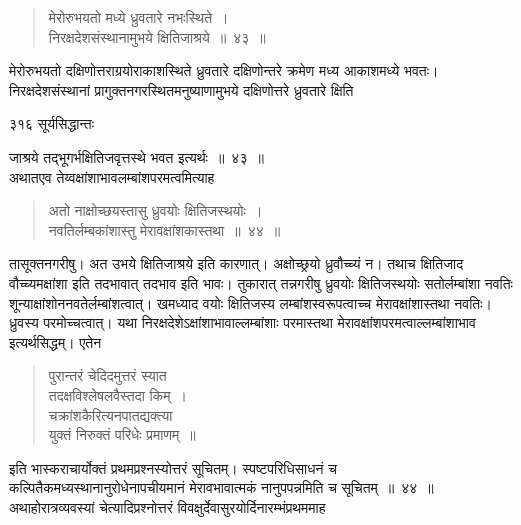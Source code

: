\documentclass[11pt, openany]{book}
\begin{document}
 \begin{quote}
{\ssi मेरोरुभयतो मध्ये ध्रुवतारे नभःस्थिते~।\\
 निरक्षदेशसंस्थानामुभये क्षितिजाश्रये~॥~४३~॥}
\end{quote}
 मेरोरुभयतो दक्षिणोत्तराग्रयोराकाशस्थिते ध्रुवतारे दक्षिणोन्तरे क्रमेण मध्य आकाशमध्ये भवतः। निरक्षदेशसंस्थानां प्रागुक्तनगरस्थितमनुष्याणामुभये दक्षिणोत्तरे ध्रुवतारे क्षिति \textendash



\newpage


\noindent ३१६ \hspace{4cm} सूर्यसिद्धान्तः
\vspace{1cm}


जाश्रये तद्भूगर्भक्षितिजवृत्तस्थे भवत इत्यर्थः~॥~४३~॥\\
\noindent अथातएव तेय्वक्षांशाभावलम्बांशपरमत्वमित्याह \textendash

 \begin{quote}
{\ssi अतो नाक्षोच्छयस्तासु ध्रुवयोः क्षितिजस्थयोः~।\\
 नवतिर्लम्बकांशास्तु मेरावक्षांशकास्तथा~॥~४४~॥}
 \end{quote}

 तासूक्तनगरीषु। अत उभये क्षितिजाश्रये इति कारणात्। अक्षोच्छ्रयो ध्रुवौच्च्यं न। तथाच क्षितिजाद वौच्च्यमक्षांशा इति तदभावात् तदभाव इति भावः। तुकारात् तन्नगरीषु ध्रुवयोः क्षितिजस्थयोः सतोर्लम्बांशा नवतिः शून्याक्षांशोननवतेर्लम्बांशत्वात्। खमध्याद वयोः क्षितिजस्य लम्बांशस्वरूपत्वाच्च मेरावक्षांशास्तथा नवतिः। ध्रुवस्य परमोच्चत्वात्। यथा निरक्षदेशेऽक्षांशाभावाल्लम्बांशाः परमास्तथा मेरावक्षांशपरमत्वाल्लम्बांशाभाव इत्यर्थसिद्धम्। एतेन 

\begin{quote}
{\qt  पुरान्तरं चेदिदमुत्तरं स्यात \\
तदक्षविश्लेषलवैस्तदा किम्~।\\
चक्रांशकैरित्यनपातद्यक्त्या\\
युक्तं निरुक्तं परिधेः प्रमाणम्~॥}
\end{quote}

 इति भास्कराचार्योक्तं प्रथमप्रश्नस्योत्तरं सूचितम्। स्पष्टपरिधिसाधनं च कल्पितैकमध्यस्थानानुरोधेनापचीयमानं मेरावभावात्मकं नानुपपन्नमिति च सूचितम्~॥~४४~॥\\
\noindent अथाहोरात्रव्यवस्यां चेत्यादिप्रश्नोत्तरं विवक्षुर्देवासुरयोर्दिनारम्भंप्रथममाह \textendash
\end{document}
